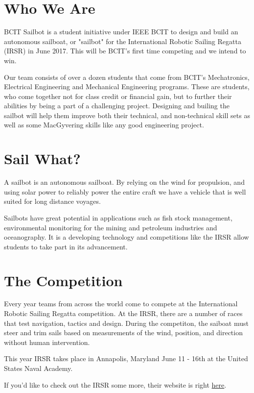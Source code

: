 \documentclass{article}
\begin{document}


\section*{Who We Are}
BCIT Sailbot is a student initiative under IEEE BCIT to design and build an
autonomous sailboat, or "sailbot" for the International Robotic Sailing Regatta 
(IRSR) in June 2017. This will be BCIT's first time competing and we intend to 
win.

Our team consists of over a dozen students that come from BCIT's Mechatronics, 
Electrical Engineering and Mechanical Engineering programs. These are students, 
who come together not for class credit or financial gain, but to further their 
abilities by being a part of a challenging project. Designing and builing the 
sailbot will help them improve both their technical, and non-technical skill 
sets as well as some MacGyvering skills like any good engineering project.

\section*{Sail What?}
A sailbot is an autonomous sailboat. By relying on the wind for propulsion, and 
using solar power to reliably power the entire craft we have a vehicle that is
well suited for long distance voyages.

Sailbots have great potential in applications such as fish stock management, 
environmental monitoring for the mining and petroleum industries and 
oceanography. It is a developing technology and competitions like the IRSR allow
students to take part in its advancement.

\section*{The Competition}
Every year teams from across the world come to compete at the International 
Robotic Sailing Regatta competition. At the IRSR, there are a number of races 
that test navigation, tactics and design. During the competiton, the saiboat 
must steer and trim sails based on measurements of the wind, position, and 
direction without human intervention. 

This year IRSR takes place in Annapolis, Maryland June 11 - 16th at the United 
States Naval Academy. 

If you'd like to check out the IRSR some more, their website is right 
\href{http://sailbot.org}{here}.
\end{document}

